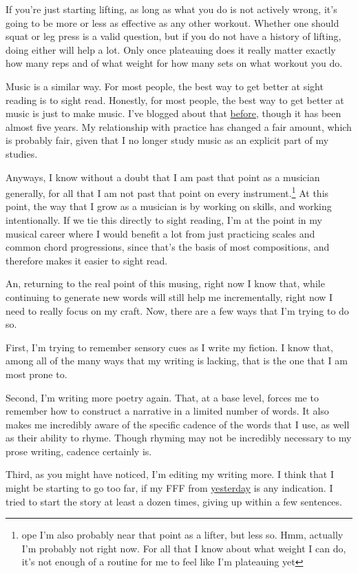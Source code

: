 \documentclass[12pt]{article}[titlepage]
\newcommand{\1}{\={a}}
\newcommand{\2}{\={e}}
\newcommand{\3}{\={\i}}
\newcommand{\4}{\=o}
\newcommand{\5}{\=u}
\newcommand{\6}{\={A}}
\renewcommand{\,}{\textsuperscript{,}}
\begin{document}
If you're just starting lifting, as long as what you do is not actively wrong, it's going to be more or less as effective as any other workout.
Whether one should squat or leg press is a valid question, but if you do not have a history of lifting, doing either will help a lot.
Only once plateauing does it really matter exactly how many reps and of what weight for how many sets on what workout you do.

Music is a similar way.
For most people, the best way to get better at sight reading is to sight read.
Honestly, for most people, the best way to get better at music is just to make music.
I've blogged about that \href{how-i-practice.html}{before}, though it has been almost five years.
My relationship with practice has changed a fair amount, which is probably fair, given that I no longer study music as an explicit part of my studies.

Anyways, I know without a doubt that I am past that point as a musician generally, for all that I am not past that point on every instrument.\footnote{ope I'm also probably near that point as a lifter, but less so. Hmm, actually I'm probably not right now. For all that I know about what weight I can do, it's not enough of a routine for me to feel like I'm plateauing yet}
At this point, the way that I grow as a musician is by working on skills, and working intentionally.
If we tie this directly to sight reading, I'm at the point in my musical career where I would benefit a lot from just practicing scales and common chord progressions, since that's the basis of most compositions, and therefore makes it easier to sight read.

An, returning to the real point of this musing, right now I know that, while continuing to generate new words will still help me incrementally, right now I need to really focus on my craft.
Now, there are a few ways that I'm trying to do so.

First, I'm trying to remember sensory cues as I write my fiction.
I know that, among all of the many ways that my writing is lacking, that is the one that I am most prone to.

Second, I'm writing more poetry again.
That, at a base level, forces me to remember how to construct a narrative in a limited number of words.
It also makes me incredibly aware of the specific cadence of the words that I use, as well as their ability to rhyme.
Though rhyming may not be incredibly necessary to my prose writing, cadence certainly is.

Third, as you might have noticed, I'm editing my writing more.
I think that I might be starting to go too far, if my FFF from \href{flash-fiction-230.html}{yesterday} is any indication.
I tried to start the story at least a dozen times, giving up within a few sentences.
\end{document}
